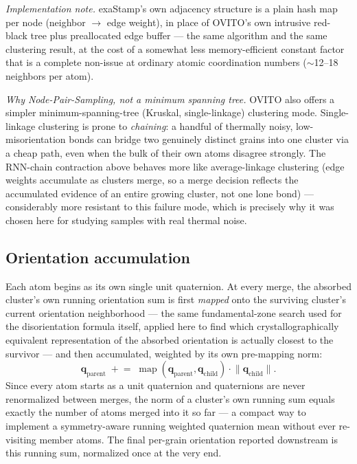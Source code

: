\documentclass[11pt,a4paper]{article}
\newcommand{\vb}[1]{\boldsymbol{#1}}
\begin{document}
\emph{Implementation note.} exaStamp's own adjacency structure is a plain hash map per node
(neighbor $\to$ edge weight), in place of OVITO's own intrusive red-black tree plus preallocated
edge buffer — the same algorithm and the same clustering result, at the cost of a somewhat less
memory-efficient constant factor that is a complete non-issue at ordinary atomic coordination
numbers ($\sim$12--18 neighbors per atom).

\emph{Why Node-Pair-Sampling, not a minimum spanning tree.} OVITO also offers a simpler
minimum-spanning-tree (Kruskal, single-linkage) clustering mode. Single-linkage clustering is prone
to \emph{chaining}: a handful of thermally noisy, low-misorientation bonds can bridge two
genuinely distinct grains into one cluster via a cheap path, even when the bulk of their own atoms
disagree strongly. The RNN-chain contraction above behaves more like average-linkage clustering
(edge weights accumulate as clusters merge, so a merge decision reflects the accumulated evidence of
an entire growing cluster, not one lone bond) — considerably more resistant to this failure mode,
which is precisely why it was chosen here for studying samples with real thermal noise.

\subsection{Orientation accumulation}
\label{sec:orient}

Each atom begins as its own single unit quaternion. At every merge, the absorbed cluster's own
running orientation sum is first \emph{mapped} onto the surviving cluster's current orientation
neighborhood — the same fundamental-zone search used for the disorientation formula itself, applied
here to find which crystallographically equivalent representation of the absorbed orientation is
actually closest to the survivor — and then accumulated, weighted by its own pre-mapping norm:
\begin{equation}
  \vb{q}_{\text{parent}} \;\mathrel{+}= \; \operatorname{map}(\vb{q}_{\text{parent}}, \vb{q}_{\text{child}}) \cdot \lVert \vb{q}_{\text{child}} \rVert .
\end{equation}
Since every atom starts as a unit quaternion and quaternions are never renormalized between merges,
the norm of a cluster's own running sum equals exactly the number of atoms merged into it so far —
a compact way to implement a symmetry-aware running weighted quaternion mean without ever
re-visiting member atoms. The final per-grain orientation reported downstream is this running sum,
normalized once at the very end.
\end{document}
